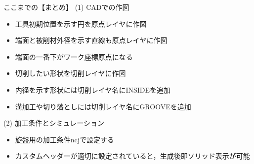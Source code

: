 \vspace*{3zh}
\begin{itembox}[l]{ここまでの【まとめ】}
(1) CADでの作図
\begin{itemize}
\item 工具初期位置を示す円を原点レイヤに作図
\item 端面と被削材外径を示す直線も原点レイヤに作図
\item 端面の一番下がワーク座標原点になる
\item 切削したい形状を切削レイヤに作図
\item 内径を示す形状には切削レイヤ名にINSIDEを追加
\item 溝加工や切り落としには切削レイヤ名にGROOVEを追加
\end{itemize}
(2) 加工条件とシミュレーション
\begin{itemize}
\item 旋盤用の加工条件ncjで設定する
\item カスタムヘッダーが適切に設定されていると，生成後即ソリッド表示が可能
\end{itemize}
\end{itembox}
